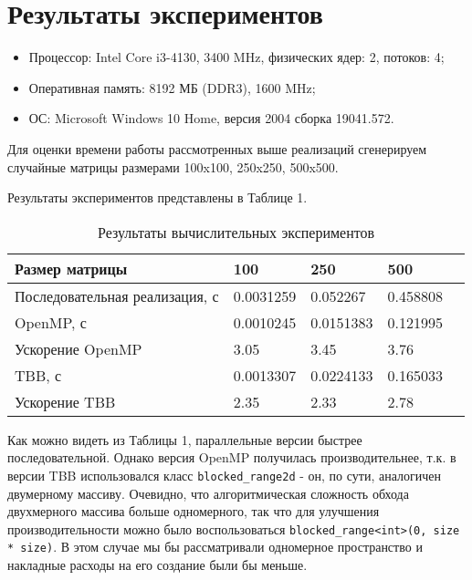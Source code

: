 \documentclass{article}
\begin{document}
\section*{Результаты экспериментов}
\begin{itemize}
\item Процессор: Intel Core i3-4130, 3400 MHz, физических ядер: 2, потоков: 4;
\item Оперативная память: 8192 МБ (DDR3), 1600 MHz;
\item ОС: Microsoft Windows 10 Home, версия 2004 сборка 19041.572.
\end{itemize}

\par Для оценки времени работы рассмотренных выше реализаций сгенерируем случайные матрицы размерами 100x100, 250x250, 500x500.
\par Результаты экспериментов представлены в Таблице 1.

\begin{table}[!h]
\caption{Результаты вычислительных экспериментов}
\renewcommand{\arraystretch}{1.8} 
\centering
\begin{tabular}{|l*{4}{|l}}
\hline
Размер матрицы & 100 & 250 & 500 \\
\hline
Последовательная реализация, с & 0.0031259 &  0.052267 & 0.458808 \\
\hline
OpenMP, с & 0.0010245 & 0.0151383 & 0.121995 \\
\hline
Ускорение OpenMP & 3.05 & 3.45 & 3.76 \\
\hline
TBB, с & 0.0013307 & 0.0224133 & 0.165033 \\
\hline
Ускорение TBB & 2.35 & 2.33 & 2.78 \\
\hline
\end{tabular}
\end{table}

\par Как можно видеть из Таблицы 1, параллельные версии быстрее последовательной. Однако версия OpenMP получилась производительнее,
т.к. в версии TBB использовался класс \lstinline$blocked_range2d$ - он, по сути, аналогичен двумерному массиву. 
Очевидно, что алгоритмическая сложность обхода двухмерного массива больше одномерного, так что для улучшения производительности можно 
было воспользоваться \lstinline$blocked_range<int>(0, size * size)$. В этом случае мы бы рассматривали одномерное пространство и 
накладные расходы на его создание были бы меньше.
\end{document}
